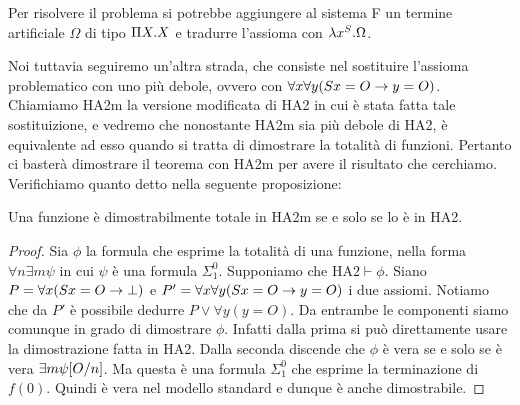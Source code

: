 \documentclass[]{marticle}
\begin{document}
Per risolvere il problema si potrebbe aggiungere al sistema F un termine
artificiale $\Omega$ di tipo $\P X.X$ e tradurre l'assioma con $\l x^S.\Omega$.

Noi tuttavia seguiremo un'altra strada, che consiste nel sostituire l'assioma
problematico con uno pi\`u debole, ovvero con $\forall x \forall y (Sx=O\rar
y=O)$. Chiamiamo HA2m la versione modificata di HA2 in cui \`e stata fatta
tale sostituizione, e vedremo che nonostante HA2m sia pi\`u debole di HA2, \`e
equivalente ad esso quando si tratta di dimostrare la totalit\`a di funzioni.
Pertanto ci baster\`a dimostrare il teorema con HA2m per avere il risultato che
cerchiamo. Verifichiamo quanto detto nella seguente proposizione:

\begin{block}[Proposizione]
    Una funzione \`e dimostrabilmente totale in HA2m se e solo se lo \`e in HA2.
\end{block}

\begin{proof}
    Sia $\phi$ la formula che esprime la totalit\`a di una funzione, nella forma 
    $\forall n \exists m \psi$ in cui $\psi$ \`e una formula $\Sigma^0_1$.
    Supponiamo che $\text{HA2}\vdash\phi$.
    Siano $P = \forall x (Sx=O\rar \bot)$ e $P' = \forall x \forall y (Sx=O\rar
    y=O)$ i due assiomi. Notiamo che da $P'$ \`e possibile dedurre $P \lor
    \forall y(y=O)$. Da entrambe le componenti siamo comunque in grado di
    dimostrare $\phi$. Infatti dalla prima si pu\`o direttamente usare la
    dimostrazione fatta in HA2. Dalla seconda discende che $\phi$ \`e vera se e
    solo se \`e vera $\exists m \psi\sub{O}{n}$. Ma questa \`e una formula
    $\Sigma^0_1$ che esprime la terminazione di $f(0)$. Quindi \`e vera nel
    modello standard e dunque \`e anche dimostrabile.
\end{proof}
\end{document}
